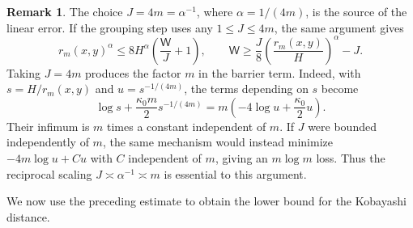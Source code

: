 \documentclass[11pt]{article}
\theoremstyle{definition}
\newtheorem{remark}[theorem]{Remark}
\begin{document}
\begin{remark}\label{rem:weighted-exit-idea}
The choice \(J=4m=\alpha^{-1}\), where \(\alpha=1/(4m)\), is the
source of the linear error. If the grouping step uses any
\(1\le J\le4m\), the same argument gives
\[
r_m(x,y)^\alpha
\le8H^\alpha\left(\frac{\mathsf W}{J}+1\right),
\qquad
\mathsf W\ge\frac J8\left(\frac{r_m(x,y)}H\right)^\alpha-J.
\]
Taking \(J=4m\) produces the factor \(m\) in the barrier term.
Indeed, with \(s=H/r_m(x,y)\) and \(u=s^{-1/(4m)}\), the terms
depending on \(s\) become
\[
\log s+\frac{\kappa_0m}{2}s^{-1/(4m)}
=m\left(-4\log u+\frac{\kappa_0}{2}u\right).
\]
Their infimum is \(m\) times a constant independent of \(m\).
If \(J\) were bounded independently of \(m\), the same mechanism
would instead minimize \(-4m\log u+Cu\) with \(C\) independent of
\(m\), giving an \(m\log m\) loss. Thus the reciprocal scaling
\(J\asymp\alpha^{-1}\asymp m\) is essential to this argument.
\end{remark}


We now use the preceding  estimate to obtain the lower
bound for the Kobayashi distance.
\end{document}
